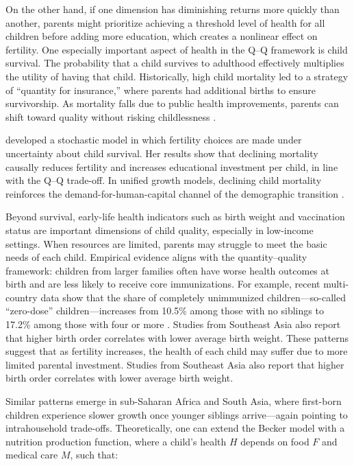 \documentclass[]{AEA}
\begin{document}
On the other hand, if one dimension has diminishing returns more quickly
than another, parents might prioritize achieving a threshold level of
health for all children before adding more education, which creates a
nonlinear effect on fertility. One especially important aspect of health
in the Q--Q framework is child survival. The probability that a child
survives to adulthood effectively multiplies the utility of having that
child. Historically, high child mortality led to a strategy of
``quantity for insurance,'' where parents had additional births to
ensure survivorship. As mortality falls due to public health
improvements, parents can shift toward quality without risking
childlessness \citep{kalemli2002does, kalemli2000mortality}.

\citet{kalemli2002does} developed a stochastic model in which fertility
choices are made under uncertainty about child survival. Her results
show that declining mortality causally reduces fertility and increases
educational investment per child, in line with the Q--Q trade-off. In
unified growth models, declining child mortality reinforces the
demand-for-human-capital channel of the demographic transition
\citep{galor2004physical}.

Beyond survival, early-life health indicators such as birth weight and
vaccination status are important dimensions of child quality, especially
in low-income settings. When resources are limited, parents may struggle
to meet the basic needs of each child. Empirical evidence aligns with
the quantity--quality framework: children from larger families often
have worse health outcomes at birth and are less likely to receive core
immunizations. For example, recent multi-country data show that the
share of completely unimmunized children---so-called ``zero-dose''
children---increases from 10.5\% among those with no siblings to 17.2\%
among those with four or more \citep{costa2024child}. Studies from
Southeast Asia also report that higher birth order correlates with lower
average birth weight. These patterns suggest that as fertility
increases, the health of each child may suffer due to more limited
parental investment. Studies from Southeast Asia
\citep{chen2021population} also report that higher birth order
correlates with lower average birth weight.

Similar patterns emerge in sub-Saharan Africa
\citep{bishwakarma2019first} and South Asia, where first-born children
experience slower growth once younger siblings arrive---again pointing
to intrahousehold trade-offs. Theoretically, one can extend the Becker
model with a nutrition production function, where a child's health \(H\)
depends on food \(F\) and medical care \(M\), such that:
\end{document}
